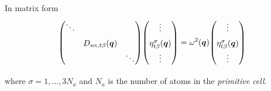 \begin{frame}
  In matrix form
  \begin{equation*}
    {
    \begin{pmatrix}
      \renewcommand*{\arraystretch}{1.5}
      \ddots & \phantom{A} & \phantom{A} \\
      \phantom{A} & D_{s\alpha,t\beta}(\boldsymbol{q})& \phantom{A} \\
      \phantom{A} & \tikzmark{Dmatrix}  \phantom{A} & \ddots
    \end{pmatrix}
    }
    {
    \begin{pmatrix}
      \renewcommand*{\arraystretch}{1.5}
      \vdots \\
      \eta^\sigma_{t\beta}(\boldsymbol{q}) \\
      \vdots \tikzmark{EigenVector1}
    \end{pmatrix}
    }
    = \omega^2(\boldsymbol{q})\tikzmark{phonon_dispersion}
    {
    \begin{pmatrix}
      \renewcommand*{\arraystretch}{1.5}
      \vdots \\
      \eta^\sigma_{t\beta}(\boldsymbol{q}) \\
      \vdots \tikzmark{polarization_vector}
    \end{pmatrix}
    }
  \end{equation*}


  \bigskip
  where $\sigma = 1,...,3N_a$ and $N_a$ is the number of atoms in the \emph{primitive cell}.
\end{frame}
